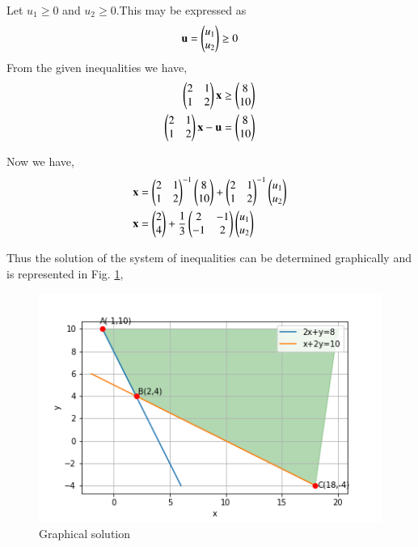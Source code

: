 Let $u_1 \geq 0$ and $u_2 \geq 0$.This may be expressed as 
\begin{equation}
    \mathbf{u} = \begin{pmatrix}u_1\\u_2\end{pmatrix} \geq 0
\end{equation}
From the given inequalities we have,
\begin{align}
   \begin{pmatrix}2&1 \\ 1&2 \end{pmatrix}\mathbf{x} &\geq \begin{pmatrix}8 \\ 10\end{pmatrix} \\
   \begin{pmatrix}2&1 \\ 1&2 \end{pmatrix}\mathbf{x} - \mathbf{u} &= \begin{pmatrix}8 \\ 10\end{pmatrix}
\end{align}

Now we have,
\begin{align}
\mathbf{x} &= \begin{pmatrix}2 & 1 \\ 1 & 2\end{pmatrix}^{-1} \begin{pmatrix}8 \\ 10\end{pmatrix} + \begin{pmatrix}2 & 1 \\ 1 & 2\end{pmatrix}^{-1} \begin{pmatrix}u_1 \\ u_2\end{pmatrix}\\
  \mathbf{x} &= \begin{pmatrix}2\\4\end{pmatrix} + \frac{1}{3}\begin{pmatrix}2 & -1 \\ -1 & 2\end{pmatrix}\begin{pmatrix}u_1 \\ u_2\end{pmatrix} 
\end{align}

Thus the solution of the system of inequalities can be determined graphically and is represented in Fig.  \ref{ineq/52/fig1},
%
\begin{figure}[!ht]
    \centering
    \includegraphics[width=\columnwidth]{solutions/su2021/2/52/assignment10.png}
    \caption{Graphical solution}
    \label{ineq/52/fig1}
\end{figure}

